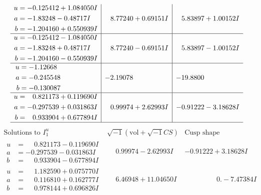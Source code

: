 \documentclass[1p]{elsarticle_modified}
\theoremstyle{definition}
\newcommand{\I}{\sqrt{-1}}
\begin{document}
$$\begin{array}{c|c|c}
\begin{aligned}
u &= -0.125412 + 1.084050 I \\
a &= -1.83248 - 0.48717 I \\
b &= -1.204160 + 0.550939 I\end{aligned}
 & \phantom{-}8.77240 + 0.69151 I & \phantom{-}5.83897 + 1.00152 I \\ \hline\begin{aligned}
u &= -0.125412 - 1.084050 I \\
a &= -1.83248 + 0.48717 I \\
b &= -1.204160 - 0.550939 I\end{aligned}
 & \phantom{-}8.77240 - 0.69151 I & \phantom{-}5.83897 - 1.00152 I \\ \hline\begin{aligned}
u &= -1.12668\phantom{ +0.000000I} \\
a &= -0.245548\phantom{ +0.000000I} \\
b &= -0.130087\phantom{ +0.000000I}\end{aligned}
 & -2.19078\phantom{ +0.000000I} & -19.8800\phantom{ +0.000000I} \\ \hline\begin{aligned}
u &= \phantom{-}0.821173 + 0.119690 I \\
a &= -0.297539 + 0.031863 I \\
b &= \phantom{-}0.933904 + 0.677894 I\end{aligned}
 & \phantom{-}0.99974 + 2.62993 I & -0.91222 - 3.18628 I\\
 \hline 
 \end{array}$$\newpage$$\begin{array}{c|c|c}  
\text{Solutions to }I^u_{1}& \I (\text{vol} + \sqrt{-1}CS) & \text{Cusp shape}\\
 \hline 
\begin{aligned}
u &= \phantom{-}0.821173 - 0.119690 I \\
a &= -0.297539 - 0.031863 I \\
b &= \phantom{-}0.933904 - 0.677894 I\end{aligned}
 & \phantom{-}0.99974 - 2.62993 I & -0.91222 + 3.18628 I \\ \hline\begin{aligned}
u &= \phantom{-}1.182590 + 0.075770 I \\
a &= \phantom{-}0.116810 + 0.162777 I \\
b &= \phantom{-}0.978144 + 0.696826 I\end{aligned}
 & \phantom{-}6.46948 + 11.04650 I & \phantom{-0.000000 } 0. - 7.47384 I \\ \hline\begin{aligned}

\end{aligned}
\end{array}$$
\end{document}
